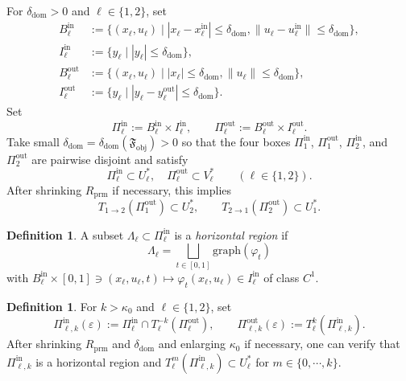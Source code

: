 \documentclass[11pt,a4paper]{article}
\theoremstyle{plain}
\theoremstyle{definition}
\newtheorem{definition}[theorem]{Definition}
\theoremstyle{plain}
\numberwithin{equation}{section}
\begin{document}
For $\delta_\mathrm{dom} > 0$ and $\ell \in \{1,2\}$, set
\begin{align*}
B_\ell^\mathrm{in}
&:=
\{
(x_\ell,u_\ell)
\mid
|x_\ell - x_\ell^\mathrm{in}| \le \delta_\mathrm{dom},
\|u_\ell - u_\ell^\mathrm{in}\| \le \delta_\mathrm{dom}
\},
\\
I_\ell^\mathrm{in}
&:=
\{
y_\ell
\mid
|y_\ell| \le \delta_\mathrm{dom}
\},
\\
B_\ell^\mathrm{out}
&:=
\{
(x_\ell,u_\ell)
\mid
|x_\ell| \le \delta_\mathrm{dom},
\|u_\ell\| \le \delta_\mathrm{dom}
\},
\\
I_\ell^\mathrm{out}
&:=
\{
y_\ell
\mid
|y_\ell - y_\ell^\mathrm{out}| \le \delta_\mathrm{dom}
\}.
\end{align*}
Set
\[
\Pi_\ell^\mathrm{in} := B_\ell^\mathrm{in} \times I_\ell^\mathrm{in},
\qquad
\Pi_\ell^\mathrm{out} := B_\ell^\mathrm{out} \times I_\ell^\mathrm{out}.
\]
Take small $\delta_\mathrm{dom} = \delta_\mathrm{dom}(\mathfrak{F}_\mathrm{obj}) > 0$ so that the four boxes $\Pi_1^\mathrm{in}$, $\Pi_1^\mathrm{out}$, $\Pi_2^\mathrm{in}$, and $\Pi_2^\mathrm{out}$ are pairwise disjoint and satisfy
\[
\Pi_\ell^\mathrm{in} \subset U_\ell^*, \quad
\Pi_\ell^\mathrm{out} \subset V_\ell^*
\qquad
(\ell \in \{1,2\}).
\]
After shrinking $R_\mathrm{prm}$ if necessary, this implies
\begin{equation}
\label{eq-Pi12asmp}
T_{1 \to 2}(\Pi_1^\mathrm{out}) \subset U_2^*,
\qquad
T_{2 \to 1}(\Pi_2^\mathrm{out}) \subset U_1^*.
\end{equation}

\begin{definition}
A subset $\Lambda_\ell \subset \Pi_\ell^\mathrm{in}$ is a \emph{horizontal region} if
\[
\Lambda_\ell = \bigsqcup_{t \in [0,1]} \mathrm{graph}(\varphi_t)
\]
with $B_\ell^\mathrm{in} \times [0, 1] \ni (x_\ell,u_\ell,t) \longmapsto \varphi_t(x_\ell,u_\ell) \in I_\ell^\mathrm{in}$ of class $C^1$.
\end{definition}

\begin{definition}
For $k > \kappa_0$ and $\ell \in \{1,2\}$, set
\[
\Pi_{\ell,k}^\mathrm{in}(\varepsilon)
:=
\Pi_\ell^\mathrm{in} \cap T_\ell^{-k}(\Pi_\ell^\mathrm{out}),
\qquad
\Pi_{\ell,k}^\mathrm{out}(\varepsilon)
:=
T_\ell^k(\Pi_{\ell,k}^\mathrm{in}).
\]
After shrinking $R_\mathrm{prm}$ and $\delta_\mathrm{dom}$ and enlarging $\kappa_0$ if necessary, one can verify that $\Pi_{\ell,k}^\mathrm{in}$ is a horizontal region and $T_\ell^m(\Pi_{\ell,k}^\mathrm{in}) \subset U_\ell^*$ for $m \in \{0, \cdots, k\}$.
\end{definition}
\end{document}
